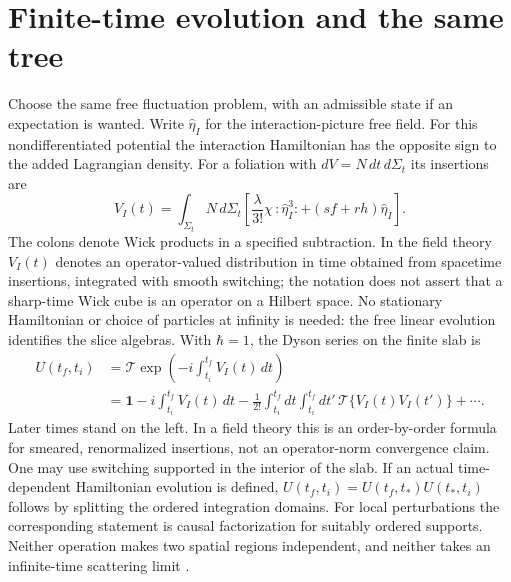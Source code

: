 \section{Finite-time evolution and the same tree}
Choose the same free fluctuation problem, with an admissible state if an
expectation is wanted. Write $\widehat\eta_I$ for the interaction-picture
free field. For this nondifferentiated potential the interaction Hamiltonian
has the opposite sign to the added Lagrangian density. For a foliation with
$dV=N\,dt\,d\Sigma_t$ its insertions are
\[
 V_I(t)=\int_{\Sigma_t} N\,d\Sigma_t\left[
  \frac{\lambda}{3!}\chi\, :\widehat\eta_I^3:
     +(s f+r h)\widehat\eta_I\right].
\]
The colons denote Wick products in a specified subtraction. In the field
theory $V_I(t)$ denotes an operator-valued distribution in time obtained
from spacetime insertions, integrated with smooth switching; the notation
does not assert that a sharp-time Wick cube is an operator on a Hilbert
space. No stationary Hamiltonian or choice of particles at infinity is
needed: the free linear evolution identifies the slice algebras. With
$\hbar=1$, the Dyson series on the finite slab is
\begin{align}
 U(t_f,t_i)&=\mathcal T\exp\!\left(-i\int_{t_i}^{t_f} V_I(t)\,dt\right)
 \nonumber\\
 &=\mathbf 1-i\int_{t_i}^{t_f}V_I(t)\,dt
 -\frac{1}{2!}\int_{t_i}^{t_f}dt\int_{t_i}^{t_f}dt'\,
   \mathcal T\{V_I(t)V_I(t')\}+\cdots .
 \label{eq:12-dyson}
\end{align}
Later times stand on the left. In a field theory this is an order-by-order
formula for smeared, renormalized insertions, not an operator-norm
convergence claim. One may use switching supported in the interior of the
slab. If an actual time-dependent Hamiltonian evolution is defined,
$U(t_f,t_i)=U(t_f,t_*)U(t_*,t_i)$ follows by splitting the ordered
integration domains. For local perturbations the corresponding statement
is causal factorization for suitably ordered supports. Neither operation
makes two spatial regions independent, and neither takes an infinite-time
scattering limit \cite{FR}.

